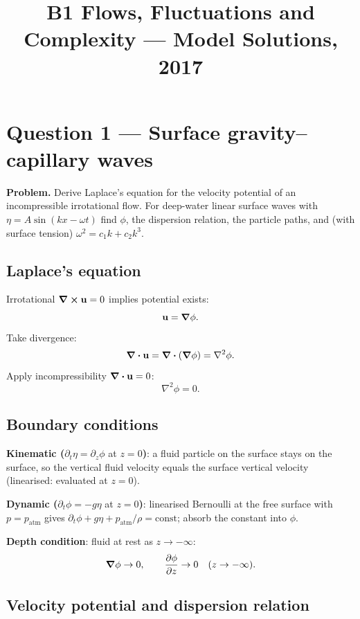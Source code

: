 \documentclass[11pt]{article}
\title{B1 Flows, Fluctuations and Complexity --- Model Solutions, 2017}
\author{}
\date{}
\newcommand{\pd}[2]{\frac{\partial #1}{\partial #2}}
\newcommand{\Lap}{\nabla^{2}}
\begin{document}
\maketitle

\section*{Question 1 --- Surface gravity--capillary waves}

\textbf{Problem.} Derive Laplace's equation for the velocity potential of an incompressible irrotational flow. For deep-water linear surface waves with $\eta=A\sin(kx-\omega t)$ find $\phi$, the dispersion relation, the particle paths, and (with surface tension) $\omega^{2}=c_{1}k+c_{2}k^{3}$.

\subsection*{Laplace's equation}

Irrotational $\curl{\vb u}=0$ implies potential exists:
\[ \vb u=\grad\phi. \]
Take divergence:
\[ \div{\vb u}=\div(\grad\phi)=\Lap\phi. \]
Apply incompressibility $\div{\vb u}=0$:
\[ \boxed{\;\Lap\phi=0.\;} \]

\subsection*{Boundary conditions}

\textbf{Kinematic (}$\partial_t\eta=\partial_z\phi$ at $z=0$\textbf{)}: a fluid particle on the surface stays on the surface, so the vertical fluid velocity equals the surface vertical velocity (linearised: evaluated at $z=0$).

\textbf{Dynamic (}$\partial_t\phi=-g\eta$ at $z=0$\textbf{)}: linearised Bernoulli at the free surface with $p=p_\text{atm}$ gives $\partial_t\phi+g\eta+p_\text{atm}/\rho=\text{const}$; absorb the constant into $\phi$.

\textbf{Depth condition}: fluid at rest as $z\to-\infty$:
\[ \grad\phi\to 0,\qquad \pd{\phi}{z}\to 0\quad(z\to-\infty). \]

\subsection*{Velocity potential and dispersion relation}
\end{document}
